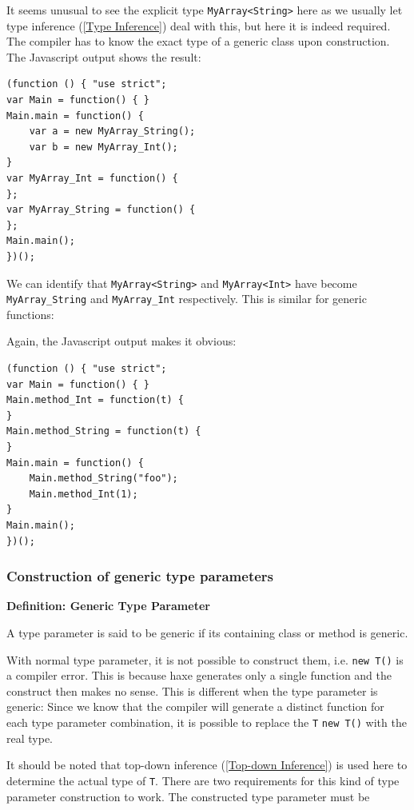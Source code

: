 \documentclass{article}
\newcommand{\target}[1]{#1}
\newcommand{\type}[1]{\texttt{#1}}
\newcommand{\expr}[1]{\texttt{#1}}
\newenvironment{myshaded}
  {\def\FrameCommand{\fboxsep=\topsep\colorbox{bgcolor}}%
  \MakeFramed {\advance\hsize-\width \FrameRestore}}%
 {\endMakeFramed}
\newcommand{\define}[3][Definition]
	{\begin{myshaded}\noindent\textbf{#1: #2}\par\nobreak\noindent\ignorespaces#3\label{def:#2}\end{myshaded}}
\newcommand{\tref}[2]{#1 (\ref{#2})}
\newcommand{\haxe}[2][]{%
}
\begin{document}
\haxe{assets/GenericClass.hx}

It seems unusual to see the explicit type \type{MyArray<String>} here as we usually let \tref{type inference}{Type Inference} deal with this, but here it is indeed required. The compiler has to know the exact type of a generic class upon construction. The \target{Javascript} output shows the result:

\begin{lstlisting}
(function () { "use strict";
var Main = function() { }
Main.main = function() {
	var a = new MyArray_String();
	var b = new MyArray_Int();
}
var MyArray_Int = function() {
};
var MyArray_String = function() {
};
Main.main();
})();
\end{lstlisting}

We can identify that \type{MyArray<String>} and \type{MyArray<Int>} have become \type{MyArray_String} and \type{MyArray_Int} respectively. This is similar for generic functions:

\haxe{assets/GenericFunction.hx}

Again, the \target{Javascript} output makes it obvious:

\begin{lstlisting}
(function () { "use strict";
var Main = function() { }
Main.method_Int = function(t) {
}
Main.method_String = function(t) {
}
Main.main = function() {
	Main.method_String("foo");
	Main.method_Int(1);
}
Main.main();
})();
\end{lstlisting}


\subsubsection{Construction of generic type parameters}
\label{Construction of generic type parameters}

\define{Generic Type Parameter}{A type parameter is said to be generic if its containing class or method is generic.}

With normal type parameter, it is not possible to construct them, i.e. \expr{new T()} is a compiler error. This is because haxe generates only a single function and the construct then makes no sense. This is different when the type parameter is generic: Since we know that the compiler will generate a distinct function for each type parameter combination, it is possible to replace the \type{T} \expr{new T()} with the real type.

\haxe{assets/GenericTypeParameter.hx} 

It should be noted that \tref{top-down inference}{Top-down Inference} is used here to determine the actual type of \type{T}. There are two requirements for this kind of type parameter construction to work. The constructed type parameter must be
\end{document}
